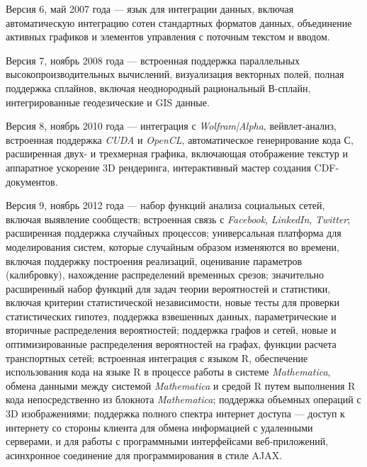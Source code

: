\begin{textitemize}
	\item Версия 6, май 2007 года --- язык для интеграции данных, включая автоматическую интеграцию сотен стандартных форматов данных, объединение активных графиков и элементов управления с поточным текстом и вводом.
	\item Версия 7, ноябрь 2008 года --- встроенная поддержка параллельных высокопроизводительных вычислений, визуализация векторных полей, полная поддержка сплайнов, включая неоднородный рациональный В-сплайн, интегрированные геодезические и GIS данные.
	\item Версия 8, ноябрь 2010 года --- интеграция с \textit{Wolfram|Alpha}, вейвлет-анализ, встроенная поддержка \textit{CUDA} и \textit{OpenCL}, автоматическое генерирование кода С, расширенная двух- и трехмерная графика, включающая отображение текстур и аппаратное ускорение 3D рендеринга, интерактивный мастер создания CDF-документов.
	\item Версия 9, ноябрь 2012 года --- набор функций анализа социальных сетей, включая выявление сообществ; встроенная связь с \textit{Facebook}, \textit{LinkedIn}, \textit{Twitter}; расширенная поддержка случайных процессов; универсальная платформа для моделирования систем, которые случайным образом изменяются во времени, включая поддержку построения реализаций, оценивание параметров (калибровку), нахождение распределений временных срезов; значительно расширенный набор функций для задач теории вероятностей и статистики, включая критерии статистической независимости, новые тесты для проверки статистических гипотез, поддержка взвешенных данных, параметрические и вторичные распределения вероятностей; поддержка графов и сетей, новые и оптимизированные распределения вероятностей на графах, функции расчета транспортных сетей; встроенная интеграция с языком R, обеспечение использования кода на языке R в процессе работы в системе \textit{Mathematica}, обмена данными между системой \textit{Mathematica} и средой R путем выполнения R кода непосредственно из блокнота \textit{Mathematica}; поддержка объемных операций с 3D изображениями; поддержка полного спектра интернет доступа --- доступ к интернету со стороны клиента для обмена информацией с удаленными серверами, и для работы с программными интерфейсами веб-приложений, асинхронное соединение для программирования в стиле AJAX.

\end{textitemize}
